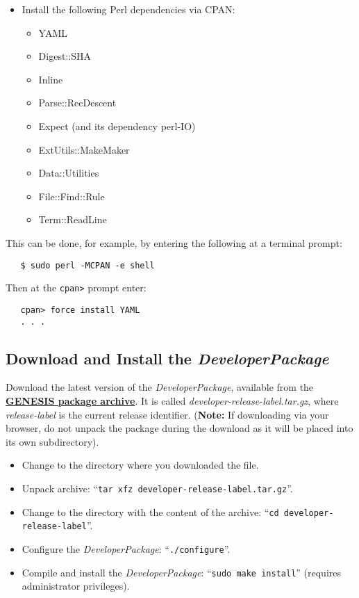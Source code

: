 \documentclass[12pt]{article}
\begin{document}
\begin{itemize}
   \item[]Install the following Perl dependencies via CPAN:
      \begin{itemize}
         \item YAML
         \item Digest::SHA
         \item Inline
         \item Parse::RecDescent
         \item Expect (and its dependency perl-IO)
         \item ExtUtils::MakeMaker
         \item Data::Utilities
         \item File::Find::Rule
         \item Term::ReadLine
      \end{itemize}
   \end{itemize}
This can be done, for example, by entering the following at a terminal prompt:
\begin{verbatim}
   $ sudo perl -MCPAN -e shell
\end{verbatim}
Then at the {\tt cpan>} prompt enter:
\begin{verbatim}
   cpan> force install YAML
   . . . 
\end{verbatim}
   
\subsection*{Download and Install the {\it DeveloperPackage}}

Download the latest version of the {\it DeveloperPackage}, available from the \href{http://repo-genesis3.cbi.utsa.edu/src/}{\bf GENESIS package archive}.  It is called {\it developer-release-label.tar.gz}, where {\it release-label} is the current release identifier. ({\bf Note:} If downloading via your browser, do not unpack the package during the download as it will be placed into its own subdirectory).
\begin{itemize}
   \item[] Change to the directory where you downloaded the file.
   \item[] Unpack archive: ``{\tt tar xfz developer-release-label.tar.gz}''.
   \item[] Change to the directory with the content of the archive: ``{\tt cd developer-release-label}''.
   \item[] Configure the {\it DeveloperPackage}: ``{\tt ./configure}''.
   \item[] Compile and install the {\it DeveloperPackage}: ``{\tt sudo make install}'' (requires administrator privileges).
\end{itemize}
\end{document}
